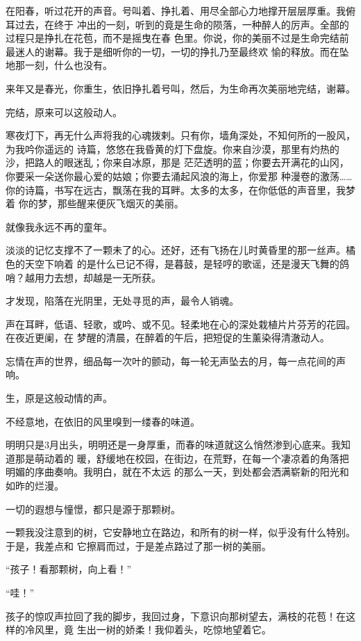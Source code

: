 \documentclass[12pt,a4paper]{article}
\begin{document}
		在阳春，听过花开的声音。号叫着、挣扎着、用尽全部心力地撑开层层厚重。我俯耳过去，在终于
	冲出的一刻，听到的竟是生命的陨落，一种醉人的厉声。全部的过程只是挣扎在花苞，而不是摇曳在春
	色里。你说，你的美丽不过是生命完结前最迷人的谢幕。我于是细听你的一切，一切的挣扎乃至最终欢
	愉的释放。而在坠地那一刻，什么也没有。

		来年又是春光，你重生，依旧挣扎着号叫，然后，为生命再次美丽地完结，谢幕。

		完结，原来可以这般动人。

		寒夜灯下，再无什么声将我的心魂拨剌。只有你，墙角深处，不知何所的一股风，为我吟你遥远的
	诗篇，悠悠在我昏黄的灯下盘旋。你来自沙漠，那里有灼热的沙，把路人的眼迷乱；你来自冰原，那是
	茫茫透明的蓝；你要去开满花的山冈，你要采一朵送你最心爱的姑娘；你要去涌起风浪的海上，你爱那
	种漫卷的激荡…… 你的诗篇，书写在远古，飘荡在我的耳畔。太多的太多，在你低低的声音里，我梦着
	你的梦，那些醒来便灰飞烟灭的美丽。

		就像我永远不再的童年。

		淡淡的记忆支撑不了一颗未了的心。还好，还有飞扬在儿时黄昏里的那一丝声。橘色的天空下响着
	的是什么已记不得，是暮鼓，是轻哼的歌谣，还是漫天飞舞的鸽哨？越用力去想，却越是一无所获。

		才发现，陷落在光阴里，无处寻觅的声，最令人销魂。

		声在耳畔，低语、轻歌，或吟、或不见。轻柔地在心的深处栽植片片芬芳的花园。在夜近更阑，在
	梦醒的清晨，在醉着的午后，把短促的生薰染得清澈动人。

		忘情在声的世界，细品每一次叶的颤动，每一轮无声坠去的月，每一点花间的声响。

		生，原是这般动情的声。

	\endwriting



		不经意地，在依旧的风里嗅到一缕春的味道。

		明明只是3月出头，明明还是一身厚重，而春的味道就这么悄然渗到心底来。我知道那是萌动着的
	暖，舒缓地在校园，在街边，在荒野，在每一个凄凉着的角落把明媚的序曲奏响。我明白，就在不太远
	的那么一天，到处都会洒满崭新的阳光和如昨的烂漫。

		一切的遐想与憧憬，都只是源于那颗树。

		一颗我没注意到的树，它安静地立在路边，和所有的树一样，似乎没有什么特别。于是，我差点和
	它擦肩而过，于是差点路过了那一树的美丽。

		“孩子！看那颗树，向上看！”

		“哇！”

		孩子的惊叹声拉回了我的脚步，我回过身，下意识向那树望去，满枝的花苞！在这样的冷风里，竟
	生出一树的娇柔！我仰着头，吃惊地望着它。
\end{document}
